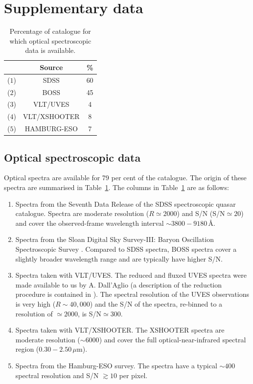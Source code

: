 \section{Supplementary data}

\begin{table}
  \centering
  \footnotesize 
  \caption{Percentage of catalogue for which optical spectroscopic data is available.}
  \label{tab:optical-data}
    \begin{tabular}{ccc}
    \hline
    & Source & \% \\
    \hline
    ($1$) & SDSS & 60 \\
    ($2$) & BOSS & 45 \\
    ($3$) & VLT/UVES & 4 \\
    ($4$) & VLT/XSHOOTER & 8 \\ 
    ($5$) & HAMBURG-ESO & 7 \\
    \hline
    \end{tabular}
\end{table} 

\subsection{Optical spectroscopic data}

Optical spectra are available for 79 per cent of the catalogue. 
The origin of these spectra are summarised in Table~\ref{tab:optical-data}. 
The columns in Table~\ref{tab:optical-data} are as follows:

\begin{enumerate}

 \item Spectra from the Seventh Data Release \citep[DR7;][]{schneider10} of the SDSS spectroscopic quasar catalogue. Spectra are moderate resolution ($R\simeq2000$) and S/N (S/N$\simeq20$) and cover the observed-frame wavelength interval $\sim3800-9180$\,\AA.   
 
 \item Spectra from the Sloan Digital Sky Survey-III: Baryon Oscillation Spectroscopic Survey \citep[SDSS-III/BOSS;][]{dawson13}. Compared to SDSS spectra, BOSS spectra cover a slightly broader wavelength range and are typically have higher S/N. 

 \item Spectra taken with VLT/UVES. The reduced and fluxed UVES spectra were made available to us by A. Dall'Aglio (a description of the reduction procedure is contained in \citealt{dallaglio08}). The spectral resolution of the UVES observations is very high ($R\sim40,000$) and the S/N of the spectra, re-binned to a resolution of $\simeq2000$, is S/N$\simeq300$. 

 \item Spectra taken with VLT/XSHOOTER. The XSHOOTER spectra are moderate resolution ($\sim6000$) and cover the full optical-near-infrared spectral region ($0.30-2.50$\,$\mu$m). 

 \item Spectra from the Hamburg-ESO survey. The spectra have a typical $\sim400$\,\kms spectral resolution and S/N $\gtrsim10$ per pixel. 

\end{enumerate}

